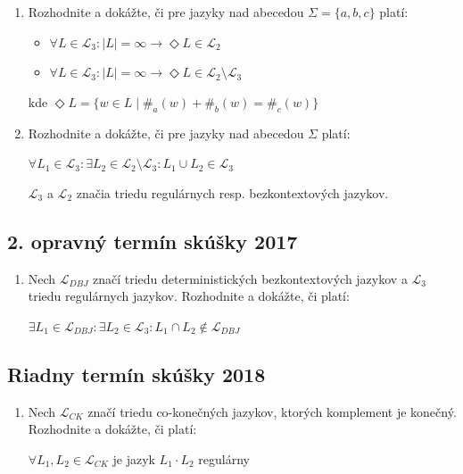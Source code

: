 \documentclass[11pt,a4paper]{article}
\begin{document}
		\begin{enumerate}
			\item Rozhodnite a dokážte, či pre jazyky nad abecedou $\Sigma = \{a,b,c\}$ platí:

			\begin{itemize}
				\item $\forall L \in \mathcal{L}_3: \vert L \vert = \infty \rightarrow \Diamond L \in  \mathcal{L}_2$
				\item $\forall L \in \mathcal{L}_3: \vert L \vert = \infty \rightarrow \Diamond L \in  \mathcal{L}_2 \setminus \mathcal{L}_3$
			\end{itemize}
	
			kde $\Diamond L = \{w \in L \mid \#_a(w) + \#_b(w) = \#_c(w)\}$

			\item Rozhodnite a dokážte, či pre jazyky nad abecedou $\Sigma$ platí:
	
			$\forall L_1 \in \mathcal{L}_3: \exists L_2 \in \mathcal{L}_2 \setminus \mathcal{L}_3: L_1 \cup L_2 \in \mathcal{L}_3$
	
			$\mathcal{L}_3$ a $\mathcal{L}_2$ značia triedu regulárnych resp. bezkontextových jazykov.
		\end{enumerate}
	
		\subsection{2. opravný termín skúšky 2017}

		\begin{enumerate}
			\item Nech $\mathcal{L}_{DBJ}$ značí triedu deterministických bezkontextových jazykov a $\mathcal{L}_{3}$ triedu regulárnych jazykov. Rozhodnite a dokážte, či platí:

			$\exists L_1 \in \mathcal{L}_{DBJ}: \exists L_2 \in \mathcal{L}_{3}: L_1 \cap L_2 \notin \mathcal{L}_{DBJ}$
		\end{enumerate}

		\subsection{Riadny termín skúšky 2018}

		\begin{enumerate}
			\item Nech $\mathcal{L}_{CK}$ značí triedu co-konečných jazykov, ktorých komplement je konečný. Rozhodnite a dokážte, či platí:

			$\forall L_1, L_2 \in \mathcal{L}_{CK}$ je jazyk $L_1 \cdot L_2$ regulárny
		\end{enumerate}
\end{document}
